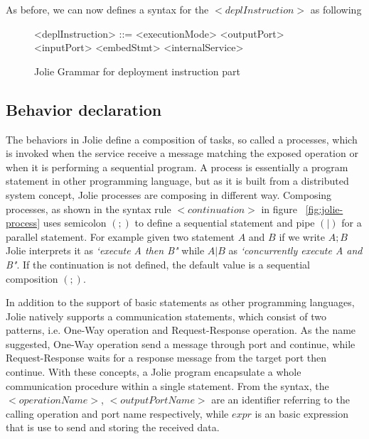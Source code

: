 






As before, we can now defines a syntax for the \(<deplInstruction>\) as following

\begin{figure}[h]
    \begin{framed}
        \begin{grammar}
            <deplInstruction> ::= <executionMode>
            \alt <outputPort>
            \alt <inputPort>
            \alt <embedStmt>
            \alt <internalService>
        \end{grammar}
    \end{framed}
    \caption{Jolie Grammar for deployment instruction part}
    \label{fig:jolie-depl}
\end{figure}


\subsection{Behavior declaration}
\label{sec:jolie-behavior}

The behaviors in Jolie define a composition of tasks, so called a processes, which is invoked when the service receive a message matching the exposed operation or when it is performing a sequential program. A process is essentially a program statement in other programming language, but as it is built from a distributed system concept, Jolie processes are composing in different way. Composing processes, as shown in the syntax rule \(<continuation>\) in figure ~\ref{fig:jolie-process}  uses semicolon \((;)\) to define a sequential statement and pipe \((|)\) for a parallel statement. For example given two statement \(A\) and \(B\) if we write \(A ; B\) Jolie interprets it as \textit{`execute A then B"} while \(A | B\) as \textit{`concurrently execute A and B"}. If the continuation is not defined, the default value is a sequential composition \((;)\).

In addition to the support of basic statements as other programming languages, Jolie natively supports a communication statements, which consist of two patterns, i.e. One-Way operation and Request-Response operation. As the name suggested, One-Way operation send a message through port and continue, while Request-Response waits for a response message from the target port then continue. With these concepts, a Jolie program encapsulate a whole communication procedure within a single statement. From the syntax, the \(<operationName>\), \(<outputPortName>\) are an identifier referring to the calling operation and port name respectively, while \(expr\) is an basic expression that is use to send and storing the received data.

